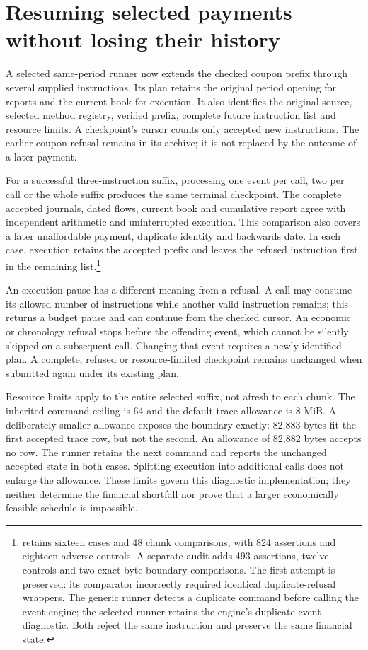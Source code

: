 \section{Resuming selected payments without losing their history}
\label{sim:coupon-program-resume}

A selected same-period runner now extends the checked coupon prefix through several supplied instructions. Its plan retains the original period opening for reports and the current book for execution. It also identifies the original source, selected method registry, verified prefix, complete future instruction list and resource limits. A checkpoint's cursor counts only accepted new instructions. The earlier coupon refusal remains in its archive; it is not replaced by the outcome of a later payment.

For a successful three-instruction suffix, processing one event per call, two per call or the whole suffix produces the same terminal checkpoint. The complete accepted journals, dated flows, current book and cumulative report agree with independent arithmetic and uninterrupted execution. This comparison also covers a later unaffordable payment, duplicate identity and backwards date. In each case, execution retains the accepted prefix and leaves the refused instruction first in the remaining list.\footnote{ retains sixteen cases and 48 chunk comparisons, with 824 assertions and eighteen adverse controls. A separate audit adds 493 assertions, twelve controls and two exact byte-boundary comparisons. The first attempt is preserved: its comparator incorrectly required identical duplicate-refusal wrappers. The generic runner detects a duplicate command before calling the event engine; the selected runner retains the engine's duplicate-event diagnostic. Both reject the same instruction and preserve the same financial state.}

An execution pause has a different meaning from a refusal. A call may consume its allowed number of instructions while another valid instruction remains; this returns a budget pause and can continue from the checked cursor. An economic or chronology refusal stops before the offending event, which cannot be silently skipped on a subsequent call. Changing that event requires a newly identified plan. A complete, refused or resource-limited checkpoint remains unchanged when submitted again under its existing plan.

Resource limits apply to the entire selected suffix, not afresh to each chunk. The inherited command ceiling is 64 and the default trace allowance is 8 MiB. A deliberately smaller allowance exposes the boundary exactly: 82,883 bytes fit the first accepted trace row, but not the second. An allowance of 82,882 bytes accepts no row. The runner retains the next command and reports the unchanged accepted state in both cases. Splitting execution into additional calls does not enlarge the allowance. These limits govern this diagnostic implementation; they neither determine the financial shortfall nor prove that a larger economically feasible schedule is impossible.


